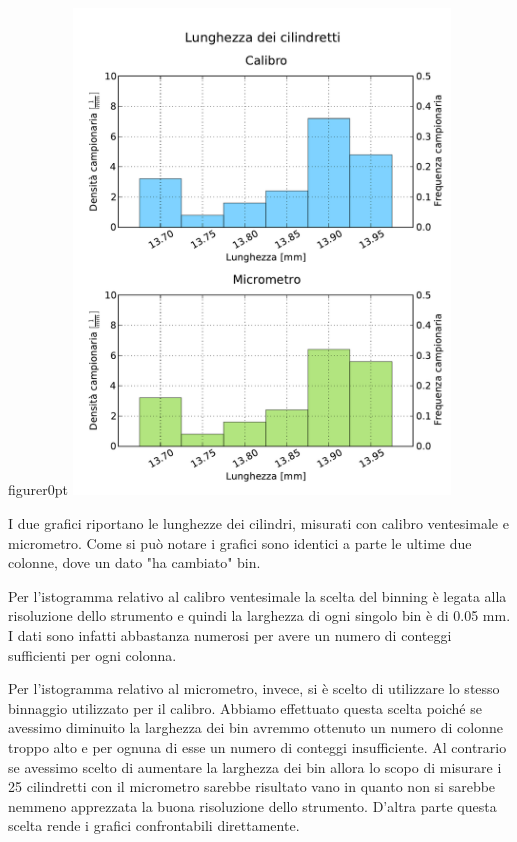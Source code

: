 \begin{wrapfloat}{figure}{r}{0pt}
	\centering
	\includegraphics[width=100mm]{grafici/Cilindretti_calibro_micrometro.pdf}
	\caption{I due grafici riportano le lunghezze dei cilindri, misurati con calibro
        ventesimale e micrometro. Come si può notare i grafici sono identici a parte
        le ultime due colonne, dove un dato "ha cambiato" bin.}
	\label{fig:calmic}
\end{wrapfloat}

Per l'istogramma relativo al calibro ventesimale la scelta del binning è legata
alla risoluzione dello strumento e quindi la larghezza di ogni singolo
bin è di 0.05 mm. I dati sono infatti abbastanza numerosi per avere un numero
di conteggi sufficienti per ogni colonna.

Per l'istogramma relativo al micrometro, invece, si è scelto di utilizzare lo stesso
binnaggio utilizzato per il calibro. Abbiamo effettuato questa scelta poiché se avessimo
diminuito la larghezza dei bin avremmo ottenuto un numero di colonne troppo alto e per
ognuna di esse un numero di conteggi insufficiente. Al contrario se avessimo scelto
di aumentare la larghezza dei bin allora lo scopo di misurare i 25 cilindretti
con il micrometro sarebbe risultato vano in quanto non si sarebbe nemmeno apprezzata
la buona risoluzione dello strumento. D'altra parte questa scelta rende i grafici 
confrontabili direttamente.

